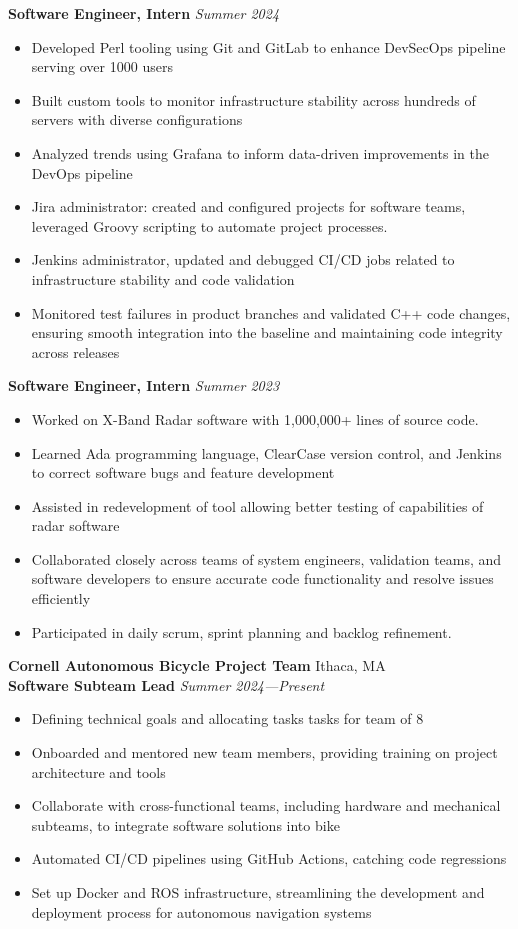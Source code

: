 \documentclass[letterpaper,8pt]{article}
\newcommand{\company}[2]{
    \vspace{6pt}
    \large \textbf{#1}
    \hfill
    {\small {#2}}
    \\
}
\newcommand{\position}[2]{
    \vspace{4pt}
    \normalsize \textbf {#1}
    \hfill {\small \textit{#2}}
    \\
}
\newcommand{\itemsBegin}{
    \begin{itemize}[leftmargin=0.2in, labelsep=0.05in, itemsep=0pt, parsep=1pt, topsep=0pt, partopsep=0pt]
}
\newcommand{\itemsEnd}{\end{itemize}}
\begin{document}
    \position{Software Engineer, Intern}{Summer 2024}
    \itemsBegin
        \item Developed Perl tooling using Git and GitLab to enhance DevSecOps pipeline serving over 1000 users
        \item Built custom tools to monitor infrastructure stability across hundreds of servers with diverse configurations
        \item Analyzed trends using Grafana to inform data-driven improvements in the DevOps pipeline
        \item Jira administrator: created and configured projects for software teams, leveraged Groovy scripting to automate project processes.
        \item Jenkins administrator, updated and debugged CI/CD jobs related to infrastructure stability and code validation
        \item Monitored test failures in product branches and validated C++ code changes, ensuring smooth integration into the baseline and maintaining code integrity across releases
    \itemsEnd

    \position{Software Engineer, Intern}{Summer 2023}
    \itemsBegin
        \item Worked on X-Band Radar software with 1,000,000+ lines of source code.
        \item Learned Ada programming language, ClearCase version control, and Jenkins to correct software bugs and feature development
        \item Assisted in redevelopment of tool allowing better testing of capabilities of radar software
        \item Collaborated closely across teams of system engineers, validation teams, and software developers to ensure accurate code functionality and resolve issues efficiently
        \item Participated in daily scrum, sprint planning and backlog refinement.
    \itemsEnd

    \company{Cornell Autonomous Bicycle Project Team}{Ithaca, MA}
    \position{Software Subteam Lead}{Summer 2024---Present}

    \itemsBegin
        \item Defining technical goals and allocating tasks tasks for team of 8
        \item Onboarded and mentored new team members, providing training on project architecture and tools
        \item Collaborate with cross-functional teams, including hardware and mechanical subteams, to integrate software solutions into bike
        \item Automated CI/CD pipelines using GitHub Actions, catching code regressions
        \item Set up Docker and ROS infrastructure, streamlining the development and deployment process for autonomous navigation systems
    \itemsEnd
\end{document}
